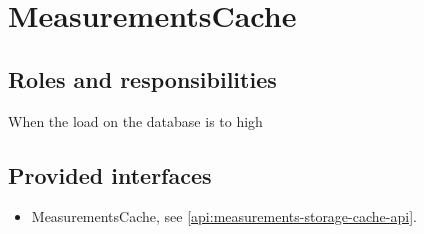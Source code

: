 \section{MeasurementsCache}
\label{element:measurements-policy}

\subsection{Roles and responsibilities}

\npar When the load on the database is to high

\subsection{Provided interfaces}

\begin{itemize}
  \item MeasurementsCache, see \ref{api:measurements-storage-cache-api}.
\end{itemize}